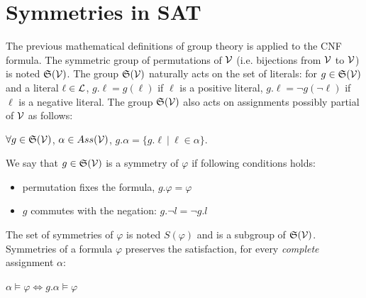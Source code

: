 \section{Symmetries in SAT}

The previous mathematical definitions of group theory is applied to the CNF formula.
The symmetric group of permutations of $\mathcal{V}$ (i.e. bijections from $\mathcal{V}$ to $\mathcal{V}$) is noted
$\mathfrak{S}(\mathcal{V})$. The group $\mathfrak{S}(\mathcal{V})$ naturally acts on the set of literals: for $g
\in \mathfrak{S}(\mathcal{V})$ and a literal $\ell \in \mathcal{L} $, $g.\ell = g(\ell)$ if $\ell$ is a
positive literal, $g.\ell = \neg g(\neg \ell)$ if $\ell$ is a negative literal.
The group $\mathfrak{S}(\mathcal{V})$ also acts on  assignments possibly partial of $\mathcal{V}$ as follows: 
\begin{center}
	$\forall g \in \mathfrak{S}(\mathcal{V})$, $\alpha \in Ass(\mathcal{V})$, $g.\alpha = \{ g.\ell ~|~ \ell \in \alpha \}$.
\end{center}

 We say that $g\in \mathfrak{S}(\mathcal{V})$ is a symmetry of $ \varphi$ if following conditions holds:
\begin{itemize}[topsep=0em]
	\item permutation fixes the formula, $g.\varphi =  \varphi$ 
	\item $g$  commutes with the negation: $g.\neg l  = \neg g.l$
\end{itemize}

The set of symmetries of $\varphi$ is noted $S(\varphi)$ and is a subgroup of $\mathfrak{S}(\mathcal{V})$.
Symmetries of a formula $\varphi$ preserves the satisfaction, for every \emph{complete} assignment $\alpha$:

\begin{center}
	$\alpha \models \varphi\Leftrightarrow g.\alpha \models \varphi$
\end{center}


